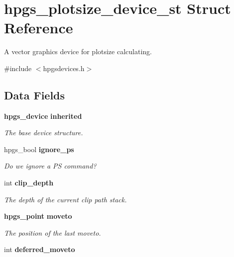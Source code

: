 \section{hpgs\_\-plotsize\_\-device\_\-st Struct Reference}
\label{structhpgs__plotsize__device__st}


A vector graphics device for plotsize calculating.  




{\ttfamily \#include $<$hpgsdevices.h$>$}

\subsection*{Data Fields}
\begin{DoxyCompactItemize}
\item 
{\bf hpgs\_\-device} {\bf inherited}\label{structhpgs__plotsize__device__st_a896e5ef39be8fb94f861db9d51800c3e}

\begin{DoxyCompactList}\small\item\em The base device structure. \item\end{DoxyCompactList}\item 
hpgs\_\-bool {\bf ignore\_\-ps}\label{structhpgs__plotsize__device__st_ab33cc0245c082105f5bb0cb9a1ce47b2}

\begin{DoxyCompactList}\small\item\em Do we ignore a PS command? \item\end{DoxyCompactList}\item 
int {\bf clip\_\-depth}\label{structhpgs__plotsize__device__st_a397e61533c894d3396d6452572cecaf3}

\begin{DoxyCompactList}\small\item\em The depth of the current clip path stack. \item\end{DoxyCompactList}\item 
{\bf hpgs\_\-point} {\bf moveto}\label{structhpgs__plotsize__device__st_a69ad990dc8df48bde3470d1dd562beac}

\begin{DoxyCompactList}\small\item\em The position of the last moveto. \item\end{DoxyCompactList}\item 
int {\bf deferred\_\-moveto}\label{structhpgs__plotsize__device__st_a5322a4a685eb24f0a3ef5bf897a85364}


\end{DoxyCompactItemize}
